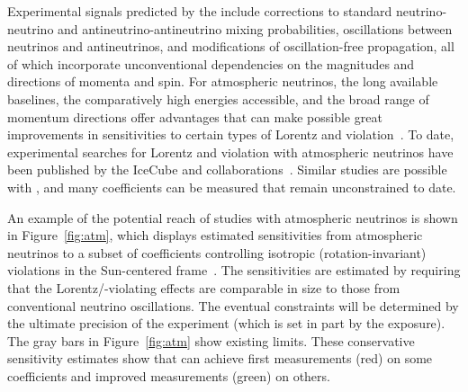Experimental signals predicted by the  include
corrections to standard neutrino-neutrino 
and antineutrino-antineutrino mixing probabilities,
oscillations between neutrinos and antineutrinos,
and modifications of oscillation-free propagation,
all of which incorporate unconventional dependencies
on the magnitudes and directions of momenta and spin.
For  atmospheric neutrinos,
the long available baselines,
the comparatively high energies accessible,
and the broad range of momentum directions
offer advantages that can make possible great
improvements 
in sensitivities to certain types of Lorentz and  violation~\cite{Kostelecky:2003cr,Kostelecky:2011gq,Kostelecky:2003xn,Kostelecky:2004hg,Diaz:2009qk,Diaz:2013saa,Diaz:2013wia}.
To date,
experimental searches for Lorentz and  violation
with atmospheric neutrinos have been published 
by the IceCube and \superk collaborations~\cite{Abbasi:2010kx,Abe:2014wla,Aartsen:2017ibm}.
Similar studies are possible with ,
and many  coefficients can be measured that remain unconstrained to date.

An example of the potential reach of studies with  atmospheric neutrinos
is shown in Figure~\ref{fig:atm},
which displays estimated sensitivities
from  atmospheric neutrinos to a subset of coefficients 
controlling isotropic (rotation-invariant) violations 
in the Sun-centered frame~\cite{Kostelecky:2002hh}.
The sensitivities are estimated by requiring that the
Lorentz/-violating effects are comparable in size to
those from conventional neutrino oscillations. 
The eventual  constraints will be determined by the
ultimate precision of the experiment (which is set in
part by the exposure).  The gray bars in Figure~\ref{fig:atm} show existing limits.  These conservative sensitivity estimates show that  can achieve first measurements (red) on some coefficients
and improved measurements (green) on others.


